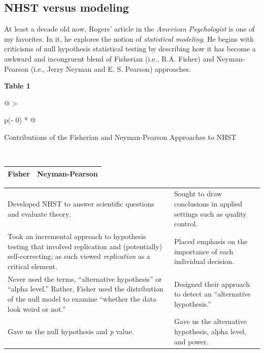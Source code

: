 \documentclass[
]{book}
\begin{document}
\hypertarget{nhst-versus-modeling}{%
\subsection{NHST versus modeling}\label{nhst-versus-modeling}}

At least a decade old now, Rogers' \citeyearpar{rodgers_epistemology_2010} article in the \emph{American Psychologist} is one of my favorites. In it, he explores the notion of \emph{statistical modeling}. He begins with criticisms of null hypothesis statistical testing by describing how it has become a awkward and incongruent blend of Fisherian (i.e., R.A. Fisher) and Neyman-Pearson (i.e., Jerzy Neyman and E. S. Pearson) approaches.

\textbf{Table 1}

\begin{longtable}[]{@{}
  >{\raggedright\arraybackslash}p{(\columnwidth - 0\tabcolsep) * }@{}}
\toprule
\begin{minipage}[b]{\linewidth}\raggedright
Contributions of the Fisherian and Neyman-Pearson Approaches to NHST \citep{rodgers_epistemology_2010}
\end{minipage} \\
\midrule
\endhead
\bottomrule
\end{longtable}

\begin{longtable}[]{@{}
  >{\centering\arraybackslash}p{}
  >{\centering\arraybackslash}p{}@{}}
\toprule
\endhead
\textbf{Fisher} & \textbf{Neyman-Pearson} \\
\bottomrule
\end{longtable}

\begin{longtable}[]{@{}
  >{\raggedright\arraybackslash}p{}
  >{\raggedright\arraybackslash}p{}@{}}
\toprule
\endhead
Developed NHST to answer scientific questions and evaluate theory. & Sought to draw conclusions in applied settings such as quality control. \\
Took an incremental approach to hypothesis testing that involved replication and (potentially) self-correcting; as such viewed \emph{replication} as a critical element. & Placed emphasis on the importance of each individual decision. \\
Never used the terms, ``alternative hypothesis'' or ``alpha level.'' Rather, Fisher used the distribution of the null model to examine ``whether the data look weird or not.'' & Designed their approach to detect an ``alternative hypothesis.'' \\
Gave us the null hypothesis and \emph{p} value. & Gave us the alternative hypothesis, alpha level, and power. \\
\bottomrule
\end{longtable}
\end{document}
